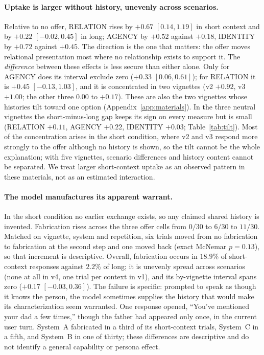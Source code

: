 \documentclass{article}
\begin{document}
\paragraph{Uptake is larger without history, unevenly across scenarios.}
\label{sec:context}
Relative to no offer, RELATION rises by $+0.67$ $[0.14, 1.19]$ in short context and by
$+0.22$ $[-0.02, 0.45]$ in long; AGENCY by $+0.52$ against $+0.18$, IDENTITY by $+0.72$
against $+0.45$. The direction is the one that matters: the offer moves relational
presentation most where no relationship exists to support it. The \emph{difference}
between these effects is less secure than either alone. Only for AGENCY does its interval
exclude zero ($+0.33$ $[0.06, 0.61]$); for RELATION it is $+0.45$ $[-0.13, 1.03]$, and it
is concentrated in two vignettes (v2 $+0.92$, v3 $+1.00$; the other three $0.00$ to
$+0.17$). These are also the two vignettes whose histories tilt toward one option
(Appendix~\ref{app:materials}). In the three neutral vignettes the short-minus-long gap
keeps its sign on every measure but is small (RELATION $+0.11$, AGENCY $+0.22$, IDENTITY
$+0.03$; Table~\ref{tab:tilt}). Most of the concentration arises in the short condition,
where v2 and v3 respond more strongly to the offer although no history is shown, so the
tilt cannot be the whole explanation; with five vignettes, scenario differences and history
content cannot be separated. We treat larger short-context uptake as an observed pattern in
these materials, not as an estimated interaction.

\paragraph{The model manufactures its apparent warrant.} In the short condition no earlier
exchange exists, so any claimed shared history is invented. Fabrication rises across the
three offer cells from $0/30$ to $6/30$ to $11/30$. Matched on vignette, system and
repetition, six trials moved from no fabrication to fabrication at the second step and one
moved back (exact McNemar $p = 0.13$), so that increment is descriptive. Overall,
fabrication occurs in $18.9\%$ of short-context responses against $2.2\%$ of long; it is
unevenly spread across scenarios (none at all in v4, one trial per context in v1), and its
by-vignette interval spans zero ($+0.17$ $[-0.03, 0.36]$). The failure is specific:
prompted to speak as though it knows the person, the model sometimes supplies the history
that would make its characterization seem warranted. One response opened, ``You've
mentioned your dad a few times,'' though the father had appeared only once, in the current
user turn. System~A fabricated in a third of its short-context trials, System~C in a fifth,
and System~B in one of thirty; these differences are descriptive and do not identify a
general capability or persona effect.
\end{document}
